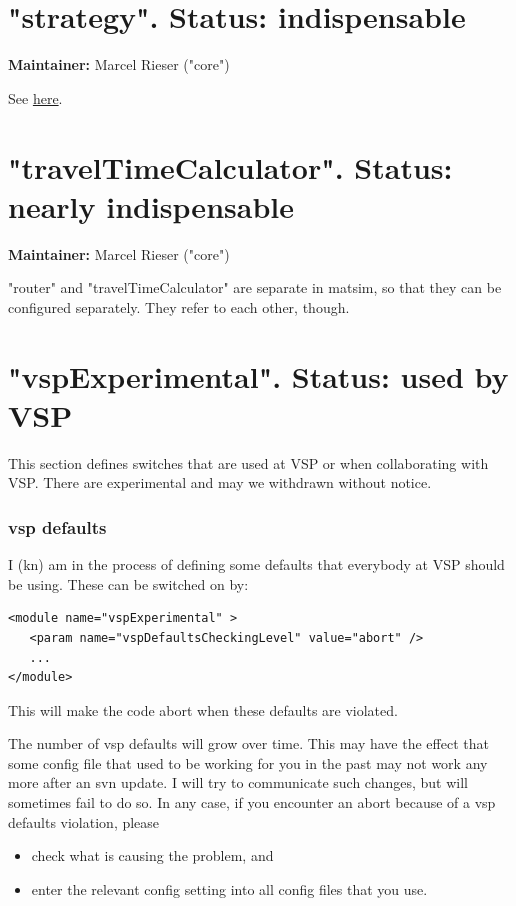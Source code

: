 \section{"strategy". Status: indispensable}

\textbf{Maintainer:} Marcel Rieser ("core")

See \href{http://matsim.org/node/478}{here}.

\vfill\eject
\section{"travelTimeCalculator". Status: nearly indispensable}

\textbf{Maintainer:} Marcel Rieser ("core")

"router" and "travelTimeCalculator" are separate in matsim, so that  they can be configured separately. They refer to each other,  though.

\vfill\eject
\section{"vspExperimental". Status: used by VSP}

This  section defines switches that are used at VSP or when collaborating  with VSP. There are experimental and may we withdrawn without  notice.

\subsubsection{vsp defaults}

I (kn) am in the process of defining some defaults that everybody at VSP should be using. These can be switched on by:
\begin{lstlisting}
<module name="vspExperimental" >
   <param name="vspDefaultsCheckingLevel" value="abort" />
   ...
</module>

\end{lstlisting}

This will make the code abort when these defaults are violated.

The number of vsp defaults will grow over time. This may have  the effect that some config file that used to be working for you in the  past may not work any more after an svn update. I will try to  communicate such changes, but will sometimes fail to do so. In any  case, if you encounter an abort because of a vsp defaults violation,  please
\begin{itemize}
	\item check what is causing the problem, and
	\item enter the relevant config setting into all config files that you use.
\end{itemize}

